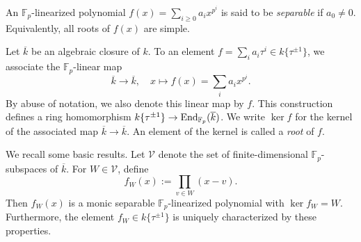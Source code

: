 \documentclass[12pt,a4paper]{amsart}
\theoremstyle{definition}
\def\F{{\mathbb F}}
\theoremstyle{remark}
\begin{document}
An $\F_p$-linearized polynomial $f(x)=\sum_{i\geq0}a_ix^{p^i}$ is said to be \emph{separable} if $a_0\neq0$. Equivalently, all roots of $f(x)$ are simple. 



Let $\overline{k}$ be an algebraic closure of $k$. To an element $f=\sum_ia_i\tau^i\in k\{\tau^{\pm1}\}$, we associate the $\F_p$-linear map 
\[\overline{k}\to \overline{k},\quad x\mapsto f(x)=\sum_ia_ix^{p^i}.
\]
By abuse of notation, we also denote this linear map by $f$.  This construction defines a ring homomorphism $k\{\tau^{\pm1}\}\to{\rm End}_{\F_p}(\overline{k})$. We write $\ker f$ for the kernel of the associated map $\overline{k}\to \overline{k}$. An element of the kernel is called a \emph{root} of $f$. 


We recall some basic results. 
Let ${\mathcal V}$ denote the set of finite-dimensional $\F_p$-subspaces of $\overline{k}$. For $W\in\mathcal V$, define  
\[f_W(x):=\prod_{v\in W}(x-v).\]
Then $f_W(x)$ is a monic separable $\F_p$-linearized polynomial with $\ker f_W=W$. Furthermore, the element $f_W\in k\{\tau^{\pm1}\}$ is uniquely characterized by these properties. 
\end{document}
